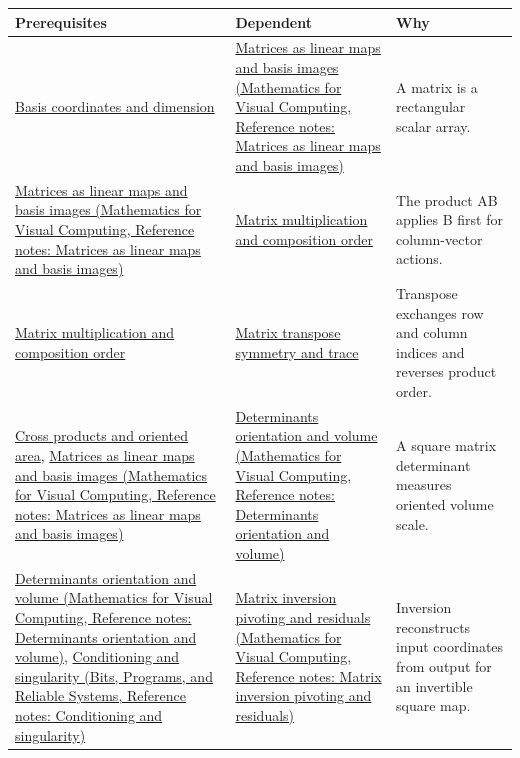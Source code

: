 {\def\LTcaptype{none} %
\begin{longtable}[]{@{}
  >{\raggedright\arraybackslash}p{}
  >{\raggedright\arraybackslash}p{}
  >{\raggedright\arraybackslash}p{}@{}}
\toprule\noalign{}
\begin{minipage}[b]{\linewidth}\raggedright
Prerequisites
\end{minipage} & \begin{minipage}[b]{\linewidth}\raggedright
Dependent
\end{minipage} & \begin{minipage}[b]{\linewidth}\raggedright
Why
\end{minipage} \\
\midrule\noalign{}
\endhead
\bottomrule\noalign{}
\endlastfoot
\hyperref[appendix-ce0341f7ea0d]{Basis coordinates and dimension} & \href{../02-Mathematics-for-Visual-Computing/main.pdf\#nameddest=appendix-bd39c3bf5d64}{Matrices as linear maps and basis images (Mathematics for Visual Computing, Reference notes: Matrices as linear maps and basis images)} & A matrix is a rectangular scalar array. \\
\href{../02-Mathematics-for-Visual-Computing/main.pdf\#nameddest=appendix-bd39c3bf5d64}{Matrices as linear maps and basis images (Mathematics for Visual Computing, Reference notes: Matrices as linear maps and basis images)} & \hyperref[appendix-ab31ef447dbf]{Matrix multiplication and composition order} & The product AB applies B first for column-vector actions. \\
\hyperref[appendix-ab31ef447dbf]{Matrix multiplication and composition order} & \hyperref[appendix-175ca5ff874d]{Matrix transpose symmetry and trace} & Transpose exchanges row and column indices and reverses product order. \\
\hyperref[appendix-2391db8052b1]{Cross products and oriented area}, \href{../02-Mathematics-for-Visual-Computing/main.pdf\#nameddest=appendix-bd39c3bf5d64}{Matrices as linear maps and basis images (Mathematics for Visual Computing, Reference notes: Matrices as linear maps and basis images)} & \href{../02-Mathematics-for-Visual-Computing/main.pdf\#nameddest=appendix-da478be01d02}{Determinants orientation and volume (Mathematics for Visual Computing, Reference notes: Determinants orientation and volume)} & A square matrix determinant measures oriented volume scale. \\
\href{../02-Mathematics-for-Visual-Computing/main.pdf\#nameddest=appendix-da478be01d02}{Determinants orientation and volume (Mathematics for Visual Computing, Reference notes: Determinants orientation and volume)}, \href{../01-Bits-Programs-and-Reliable-Systems/main.pdf\#nameddest=appendix-8f6a01f284a7}{Conditioning and singularity (Bits, Programs, and Reliable Systems, Reference notes: Conditioning and singularity)} & \href{../02-Mathematics-for-Visual-Computing/main.pdf\#nameddest=appendix-48d2e66378ab}{Matrix inversion pivoting and residuals (Mathematics for Visual Computing, Reference notes: Matrix inversion pivoting and residuals)} & Inversion reconstructs input coordinates from output for an invertible square map. \\

\end{longtable}}
